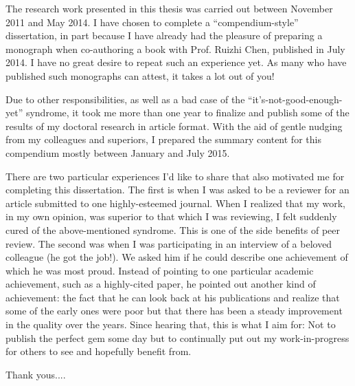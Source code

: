 The research work presented in this thesis was carried out between November 2011 and May 2014. I have chosen to complete a ``compendium-style'' dissertation, in part because I have already had the pleasure of preparing a monograph when co-authoring a book with Prof. Ruizhi Chen, published in July 2014. I have no great desire to repeat such an experience yet. As many who have published such monographs can attest, it takes a lot out of you!

Due to other responsibilities, as well as a bad case of the ``it's-not-good-enough-yet'' syndrome, it took me more than one year to finalize and publish some of the results of my doctoral research in article format. With the aid of gentle nudging from my colleagues and superiors, I prepared the summary content for this compendium mostly between January and July 2015.

There are two particular experiences I'd like to share that also motivated me for completing this dissertation. The first is when I was asked to be a reviewer for an article submitted to one highly-esteemed journal. When I realized that my work, in my own opinion, was superior to that which I was reviewing, I felt suddenly cured of the above-mentioned syndrome. This is one of the side benefits of peer review. The second was when I was participating in an interview of a beloved colleague (he got the job!). We asked him if he could describe one achievement of which he was most proud. Instead of pointing to one particular academic achievement, such as a highly-cited paper, he pointed out another kind of achievement: the fact that he can look back at his publications and realize that some of the early ones were poor but that there has been a steady improvement in the quality over the years. Since hearing that, this is what I aim for: Not to publish the perfect gem some day but to continually put out my work-in-progress for others to see and hopefully benefit from.

Thank yous....

